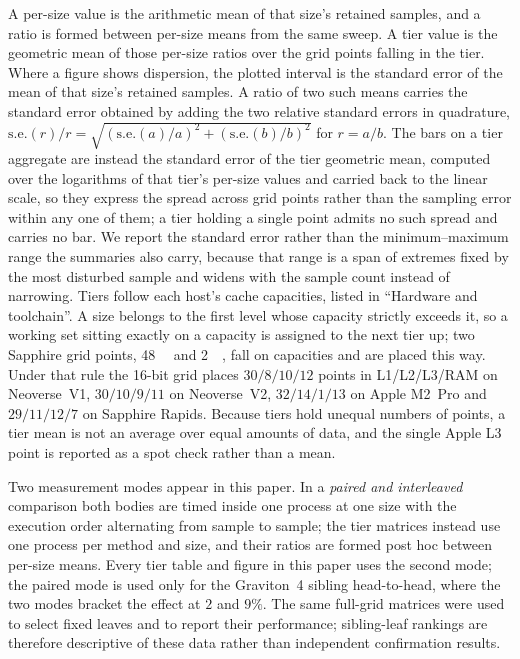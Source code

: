 \documentclass[fleqn,10pt]{wlscirep}
\begin{document}
A per-size value is the arithmetic mean of that size's retained samples, and a ratio is formed between per-size means from the same sweep. A tier value is the geometric mean of those per-size ratios over the grid points falling in the tier. Where a figure shows dispersion, the plotted interval is the standard error of the mean of that size's retained samples. A ratio of two such means carries the standard error obtained by adding the two relative standard errors in quadrature, $\mathrm{s.e.}(r)/r=\sqrt{(\mathrm{s.e.}(a)/a)^2+(\mathrm{s.e.}(b)/b)^2}$ for $r=a/b$. The bars on a tier aggregate are instead the standard error of the tier geometric mean, computed over the logarithms of that tier's per-size values and carried back to the linear scale, so they express the spread across grid points rather than the sampling error within any one of them; a tier holding a single point admits no such spread and carries no bar. We report the standard error rather than the minimum--maximum range the summaries also carry, because that range is a span of extremes fixed by the most disturbed sample and widens with the sample count instead of narrowing. Tiers follow each host's cache capacities, listed in ``Hardware and toolchain''. A size belongs to the first level whose capacity strictly exceeds it, so a working set sitting exactly on a capacity is assigned to the next tier up; two Sapphire grid points, \SI{48}{\kibi\byte} and \SI{2}{\mebi\byte}, fall on capacities and are placed this way. Under that rule the 16-bit grid places $30/8/10/12$ points in L1/L2/L3/RAM on Neoverse~V1, $30/10/9/11$ on Neoverse~V2, $32/14/1/13$ on Apple M2~Pro and $29/11/12/7$ on Sapphire Rapids. Because tiers hold unequal numbers of points, a tier mean is not an average over equal amounts of data, and the single Apple L3 point is reported as a spot check rather than a mean.

Two measurement modes appear in this paper. In a \emph{paired and interleaved} comparison both bodies are timed inside one process at one size with the execution order alternating from sample to sample; the tier matrices instead use one process per method and size, and their ratios are formed post hoc between per-size means. Every tier table and figure in this paper uses the second mode; the paired mode is used only for the Graviton~4 sibling head-to-head, where the two modes bracket the effect at $2$ and $9\%$. The same full-grid matrices were used to select fixed leaves and to report their performance; sibling-leaf rankings are therefore descriptive of these data rather than independent confirmation results.
\end{document}
